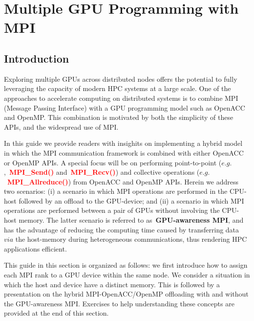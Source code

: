 \section{Multiple GPU Programming with MPI}


\subsection{Introduction}


\par
Exploring multiple GPUs across distributed nodes offers the potential to fully leveraging the capacity of modern HPC systems at a large scale.
One of the approaches to accelerate computing on distributed systems is to combine MPI (Message Passing Interface) with a GPU programming model such as OpenACC and OpenMP.
This combination is motivated by both the simplicity of these APIs, and the widespread use of MPI.


\par
In this guide we provide readers with insighits on implementing a hybrid model in which the MPI communication framework is combined with either OpenACC or OpenMP APIs.
A special focus will be on performing point-to-point ($e.g.$,~\textbf{\textcolor{red}{MPI\_Send()}} and~\textbf{\textcolor{red}{MPI\_Recv()}}) and collective operations ($e.g.$~\textbf{\textcolor{red}{MPI\_Allreduce()}}) from OpenACC and OpenMP APIs.
Herein we address two scenarios: (i) a scenario in which MPI operations are performed in the CPU-host followed by an offload to the GPU-device; and (ii) a scenario in which MPI operations are performed between a pair of GPUs without involving the CPU-host memory.
The latter scenario is referred to as~\textbf{GPU-awareness MPI}, and has the advantage of reducing the computing time caused by transferring data $via$ the host-memory during heterogeneous communications, thus rendering HPC applications efficient.


\par
This guide in this section is organized as follows: we first introduce how to assign each MPI rank to a GPU device within the same node.
We consider a situation in which the host and device have a distinct memory.
This is followed by a presentation on the hybrid MPI-OpenACC/OpenMP offloading with and without the GPU-awareness MPI.
Exercises to help understanding these concepts are provided at the end of this section.




